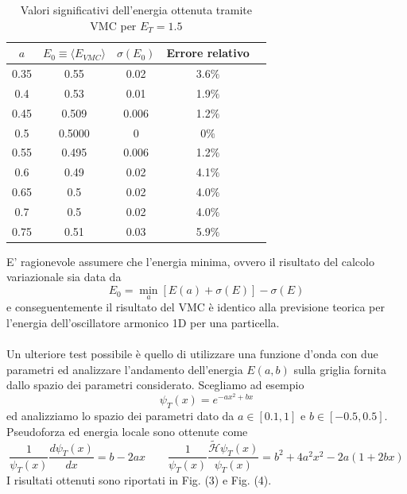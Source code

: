 \documentclass[11pt,a4paper]{article}
\begin{document}
\begin{table}
\centering
\begin{tabular}{|c|c|c|c|c|}
\hline
$a$ & $E_0 \equiv \langle E_{VMC}\rangle$ & $\sigma(E_0)$ & Errore relativo \\ \hline
0.35 & 0.55 & 0.02 & 3.6$\%$ \\ \hline
0.4 & 0.53 & 0.01 & 1.9$\%$\\ \hline
0.45 & 0.509 & 0.006 & 1.2$\%$\\ \hline
0.5 & 0.5000 &	 0 & 0$\%$ \\ \hline
0.55 & 0.495 & 0.006 & 1.2$\%$\\ \hline
0.6 & 0.49 & 0.02 & 4.1$\%$\\ \hline
0.65 & 0.5 	&  0.02 & 4.0$\%$\\ \hline
0.7 &  0.5 &	 0.02 & 4.0$\%$\\ \hline
0.75 & 0.51 &	 0.03 & 5.9$\%$\\ \hline
\end{tabular}
\caption{Valori significativi dell'energia ottenuta tramite VMC per $E_T=1.5$}
\end{table}
E' ragionevole assumere che l'energia minima, ovvero il risultato del calcolo variazionale sia data da
\begin{equation}\label{20}
E_0 = \min_{a}[E(a)+\sigma(E)] - \sigma(E)
\end{equation}
e conseguentemente il risultato del VMC è identico alla previsione teorica per l'energia dell'oscillatore armonico 1D per una particella. \\ \\
Un ulteriore test possibile è quello di utilizzare una funzione d'onda con due parametri ed analizzare l'andamento dell'energia $E(a,b)$ sulla griglia fornita dallo spazio dei parametri considerato. Scegliamo ad esempio
\begin{equation}
\psi_T(x) = e^{-ax^2+bx}
\end{equation}
ed analizziamo lo spazio dei parametri dato da $a\in [0.1,1]$ e $b\in [-0.5,0.5]$. Pseudoforza ed energia locale sono ottenute come
\begin{equation}
\frac{1}{\psi_T(x)} \frac{d\psi_T(x)}{dx} = b-2ax \qquad \frac{1}{\psi_T(x)} \frac{\mathcal{\tilde{H}}\psi_T(x)}{\psi_T(x)} = b^2+4 a^2 x^2-2 a (1+2 b x)
\end{equation}
I risultati ottenuti sono riportati in Fig. (3) e Fig. (4). 
\end{document}
